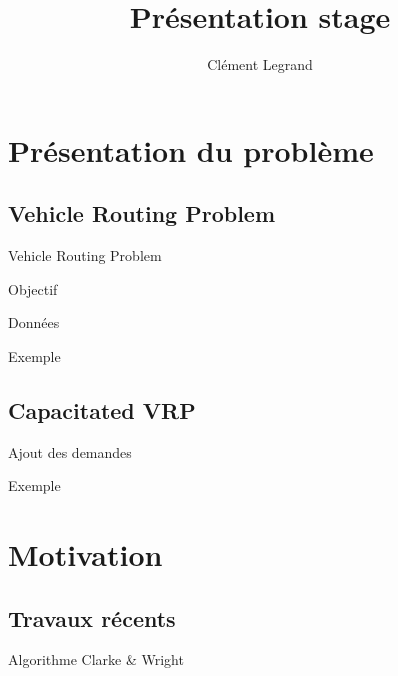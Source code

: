 \documentclass{beamer}
\title{Présentation stage}
\author{Clément Legrand}
\begin{document}
\begin{frame}[plain]
\titlepage
\end{frame}

\section{Présentation du problème}

\subsection{Vehicle Routing Problem}

\begin{frame}{Vehicle Routing Problem}
\begin{block}{Objectif}

\end{block}

\begin{block}{Données}

\end{block}

\end{frame}

\begin{frame}{Exemple} 

\end{frame}

\subsection{Capacitated VRP}

\begin{frame}{Ajout des demandes}

\end{frame}

\begin{frame}{Exemple}

\end{frame}

\section{Motivation}

\subsection{Travaux récents}

\begin{frame}{Algorithme Clarke \& Wright}

\end{frame}
\end{document}
